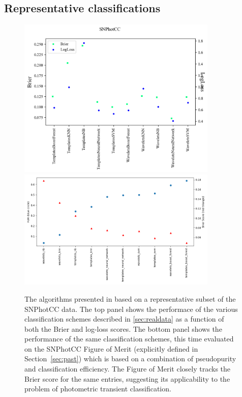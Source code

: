 \subsection{Representative classifications}
\label{sec:realresults}

\begin{figure}
	\begin{center}
		\includegraphics[width=0.85\textwidth]{./fig/SNPhotCC_res.png}\\
		 \includegraphics[width=0.85\textwidth]{./fig/fom_vs_brier.png}
		\caption{The algorithms presented in \cite{lochner_photometric_2016} based on a representative subset of the SNPhotCC data. The top panel shows the performace of the various classification schemes described in \ref{sec:realdata} as a function of both the Brier and log-loss scores. The bottom panel shows the performance of the same classification schemes, this time evaluated on the SNPhotCC Figure of Merit (explicitly defined in Section~\ref{sec:past}) which is based on a combination of pseudopurity and classification efficiency. The Figure of Merit closely tracks the Brier score for the same entries, suggesting its applicability to the problem of photometric transient classification. \label{fig:real_metric_compare}}
	\end{center}
\end{figure}

